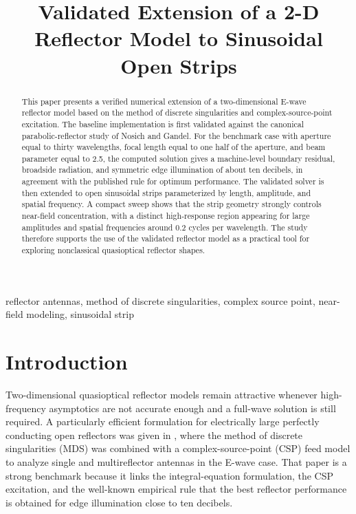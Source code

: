 \documentclass[conference]{IEEEtran}
\begin{document}
\title{Validated Extension of a 2-D Reflector Model to Sinusoidal Open Strips}

\author{
}

\maketitle

\begin{abstract}
This paper presents a verified numerical extension of a two-dimensional E-wave reflector model based on the method of discrete singularities and complex-source-point excitation. The baseline implementation is first validated against the canonical parabolic-reflector study of Nosich and Gandel. For the benchmark case with aperture equal to thirty wavelengths, focal length equal to one half of the aperture, and beam parameter equal to 2.5, the computed solution gives a machine-level boundary residual, broadside radiation, and symmetric edge illumination of about ten decibels, in agreement with the published rule for optimum performance. The validated solver is then extended to open sinusoidal strips parameterized by length, amplitude, and spatial frequency. A compact sweep shows that the strip geometry strongly controls near-field concentration, with a distinct high-response region appearing for large amplitudes and spatial frequencies around 0.2 cycles per wavelength. The study therefore supports the use of the validated reflector model as a practical tool for exploring nonclassical quasioptical reflector shapes.
\end{abstract}

\begin{IEEEkeywords}
reflector antennas, method of discrete singularities, complex source point, near-field modeling, sinusoidal strip
\end{IEEEkeywords}

\section{Introduction}
Two-dimensional quasioptical reflector models remain attractive whenever high-frequency asymptotics are not accurate enough and a full-wave solution is still required. A particularly efficient formulation for electrically large perfectly conducting open reflectors was given in \cite{nosich2007}, where the method of discrete singularities (MDS) was combined with a complex-source-point (CSP) feed model to analyze single and multireflector antennas in the E-wave case. That paper is a strong benchmark because it links the integral-equation formulation, the CSP excitation, and the well-known empirical rule that the best reflector performance is obtained for edge illumination close to ten decibels.
\end{document}
